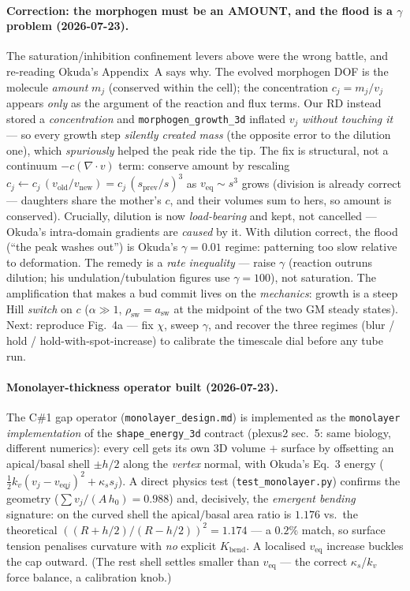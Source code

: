 \documentclass[11pt]{article}
\begin{document}
\paragraph{Correction: the morphogen must be an AMOUNT, and the flood is a $\gamma$ problem (2026-07-23).}
The saturation/inhibition confinement levers above were the wrong battle, and re-reading Okuda's Appendix~A
says why. The evolved morphogen DOF is the molecule \emph{amount} $m_j$ (conserved within the cell); the
concentration $c_j=m_j/v_j$ appears \emph{only} as the argument of the reaction and flux terms. Our RD
instead stored a \emph{concentration} and \texttt{morphogen\_growth\_3d} inflated $v_j$ \emph{without touching
it} --- so every growth step \emph{silently created mass} (the opposite error to the dilution one), which
\emph{spuriously} helped the peak ride the tip. The fix is structural, not a continuum $-c(\nabla\!\cdot\!v)$
term: conserve amount by rescaling $c_j\!\leftarrow\!c_j\,(v_{\text{old}}/v_{\text{new}})=c_j\,(s_{\text{prev}}/s)^3$
as $v_{\text{eq}}\!\sim\!s^3$ grows (division is already correct --- daughters share the mother's $c$, and
their volumes sum to hers, so amount is conserved). Crucially, dilution is now \emph{load-bearing} and kept,
not cancelled --- Okuda's intra-domain gradients are \emph{caused} by it. With dilution correct, the flood
(``the peak washes out'') is Okuda's $\gamma=0.01$ regime: patterning too slow relative to deformation. The
remedy is a \emph{rate inequality} --- raise $\gamma$ (reaction outruns dilution; his undulation/tubulation
figures use $\gamma=100$), not saturation. The amplification that makes a bud commit lives on the
\emph{mechanics}: growth is a steep Hill \emph{switch} on $c$ ($\alpha\gg1$, $\rho_{\text{sw}}=a_{\text{sw}}$
at the midpoint of the two GM steady states). Next: reproduce Fig.~4a --- fix $\chi$, sweep $\gamma$, and
recover the three regimes (blur / hold / hold-with-spot-increase) to calibrate the timescale dial before any
tube run.

\paragraph{Monolayer-thickness operator built (2026-07-23).}
The C\#1 gap operator (\texttt{monolayer\_design.md}) is implemented as the \texttt{monolayer}
\emph{implementation} of the \texttt{shape\_energy\_3d} contract (plexus2 sec.~5: same biology, different
numerics): every cell gets its own 3D volume $+$ surface by offsetting an apical$/$basal shell $\pm h/2$ along
the \emph{vertex} normal, with Okuda's Eq.~3 energy ($\tfrac12 k_v(v_j-v_{\text{eq}j})^2+\kappa_s s_j$). A
direct physics test (\texttt{test\_monolayer.py}) confirms the geometry ($\sum v_j/(A\,h_0)=0.988$) and,
decisively, the \emph{emergent bending} signature: on the curved shell the apical$/$basal area ratio is
$1.176$ vs.\ the theoretical $((R{+}h/2)/(R{-}h/2))^2=1.174$ --- a $0.2\%$ match, so surface tension penalises
curvature with \emph{no} explicit $K_{\text{bend}}$. A localised $v_{\text{eq}}$ increase buckles the cap
outward. (The rest shell settles smaller than $v_{\text{eq}}$ --- the correct $\kappa_s$/$k_v$ force balance,
a calibration knob.)
\end{document}
